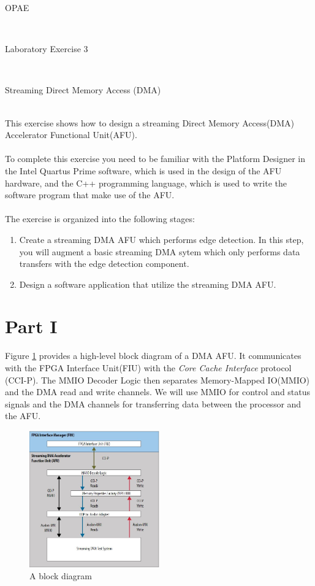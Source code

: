 \documentclass[epsfig,10pt,fullpage]{article}
\newcommand{\LabNum}{3}
\begin{document}
\centerline{\huge OPAE}
~\\
\centerline{\huge Laboratory Exercise \LabNum}
~\\
\centerline{\large Streaming Direct Memory Access (DMA)}
~\\

\noindent
This exercise shows how to design a streaming Direct Memory Access(DMA) Accelerator Functional Unit(AFU). \\
\\
To complete this exercise you need to be familiar with the Platform Designer in the Intel Quartus Prime software, which is used in the design of the AFU hardware, and the C++ programming language, which is used to write the software program that make use of the AFU.\\
\\
The exercise is organized into the following stages:
\begin{enumerate}
    \item Create a streaming DMA AFU which performs edge detection. In this step, you will augment a basic streaming DMA sytem which only performs data transfers with the edge detection component.
    \item Design a software application that utilize the streaming DMA AFU. 
\end{enumerate}


\section*{Part I}
Figure \ref{fig:diagram} provides a high-level block diagram of a DMA AFU. It communicates with the FPGA Interface Unit(FIU) with the {\it Core Cache Interface} protocol (CCI-P). The MMIO Decoder Logic then separates Memory-Mapped IO(MMIO) and the DMA read and write channels. We will use MMIO for control and status signals and the DMA channels for transferring data between the processor and the AFU.\\

\begin{figure}[h]
    \centering
    \includegraphics[width=0.5\textwidth]{figures/diagram_dmast.JPG}
    \caption{A block diagram}
    \label{fig:diagram}
\end{figure}
\end{document}
